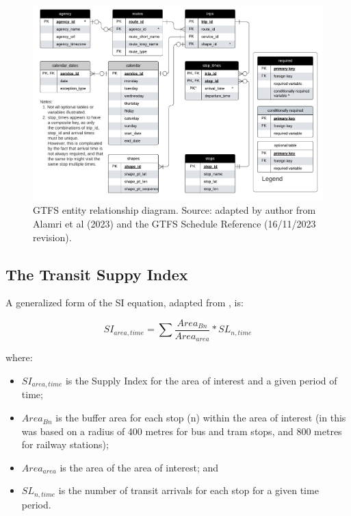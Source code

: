 \documentclass[preprint, 3p,
authoryear]{elsarticle} %
\begin{document}
\begin{figure}
\includegraphics[width=1\linewidth]{graphics/GTFS} \caption{GTFS entity relationship diagram. Source: adapted by author from Alamri et al (2023) and the GTFS Schedule Reference (16/11/2023 revision).}\label{fig:GTFS_ERD}
\end{figure}

\hypertarget{the-transit-suppy-index}{%
\subsection{The Transit Suppy Index}\label{the-transit-suppy-index}}

A generalized form of the SI equation, adapted from
\citet{currie2010identifying}, is:

\[SI_{area, time} = \sum{\frac{Area_{Bn}}{Area_{area}}*SL_{n, time}}\]

where:

\begin{itemize}
\item
  \(SI_{area, time}\) is the Supply Index for the area of interest and a
  given period of time;
\item
  \(Area_{Bn}\) is the buffer area for each stop (n) within the area of
  interest (in \citet{currie2010identifying} this was based on a radius
  of 400 metres for bus and tram stops, and 800 metres for railway
  stations);
\item
  \(Area_{area}\) is the area of the area of interest; and
\item
  \(SL_{n,time}\) is the number of transit arrivals for each stop for a
  given time period.
\end{itemize}
\end{document}
